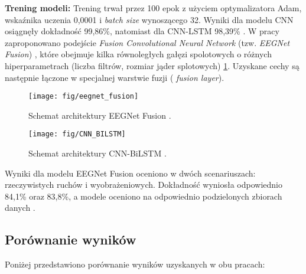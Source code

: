 \documentclass[eeg_v4.tex]{subfiles}
\begin{document}
    \textbf{Trening modeli:}
    Trening trwał przez 100 epok z użyciem optymalizatora Adam, wskaźnika uczenia 0,0001 i \emph{batch size}
    wynoszącego 32. Wyniki dla modelu CNN osiągnęły dokładność 99,86\%, natomiast dla CNN-LSTM 98,39\%
    \cite{boutarfaia2023}.
    W pracy \cite{roots2020} zaproponowano podejście
    \emph{Fusion Convolutional Neural Network} (tzw. \emph{EEGNet Fusion})
    , które obejmuje kilka równoległych gałęzi spolotowych o różnych hiperparametrach (liczba filtrów, rozmiar jąder
    splotowych) \ref{fig:eegnet_fusion}. Uzyskane cechy są następnie łączone w specjalnej warstwie fuzji (
    \emph{fusion layer}).

    \begin{figure}[h!]
        \centering
        \texttt{[image: fig/eegnet\_fusion]}

        \caption{Schemat architektury EEGNet Fusion \cite{roots2020}.}
        \label{fig:eegnet_fusion}
    \end{figure}

    \begin{figure}[h!]
        \centering
        \texttt{[image: fig/CNN\_BILSTM]}
        \caption{Schemat architektury CNN-BiLSTM \cite{boutarfaia2023}.}
        \label{fig:CNN-BiLSTM}
    \end{figure}

    Wyniki dla modelu EEGNet Fusion oceniono w dwóch scenariuszach: rzeczywistych ruchów i wyobrażeniowych. Dokładność
    wyniosła odpowiednio 84,1\% oraz 83,8\%, a modele oceniono na odpowiednio podzielonych zbiorach danych
    \cite{roots2020}.

    \subsection{Porównanie wyników}
    Poniżej przedstawiono porównanie wyników uzyskanych w obu pracach:

    \begin{table}[h!]
        \centering
        \caption{Porównanie wyników dla różnych modeli \cite{boutarfaia2023,roots2020}.}
        \label{tab:results}
    \end{table}
\end{document}
